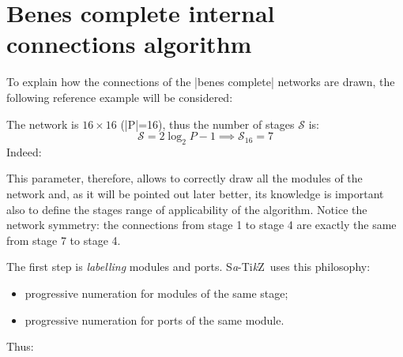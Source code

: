 \documentclass{ltxdoc}
\newcommand\Tikz{Ti\textit kZ}
\newcommand{\saTikZ}{S\textit{a}-\Tikz}
\begin{document}
\section{Benes complete internal connections algorithm}
\label{sec:benesconnalg}
To explain how the connections of the |benes complete| networks are drawn, the following reference example will be considered:
\begin{center}
\scalebox{0.75}{
	\begin{tikzpicture}[module size=0.75cm, module ysep=1, module xsep=2.5]
		\node[P=16, benes complete]{};
	\end{tikzpicture}
}
\end{center}
The network is $16\times 16$ (|P|=16), thus the number of stages $\mathcal{S}$ is:
\[\mathcal{S}=2\log_2{P}-1 \implies \mathcal{S}_{16}=7\]
Indeed:
\begin{center}
\end{center}
This parameter, therefore, allows to correctly draw all the modules of the network and, as it will be pointed out later better, its knowledge is important also to define the stages range of applicability of the algorithm. Notice the network symmetry: the connections from stage 1 to stage 4 are exactly the same from stage 7 to stage 4.  
\pagebreak

The first step is \emph{labelling} modules and ports. \saTikZ\ uses this philosophy:
\begin{itemize}
\item progressive numeration for modules of the same stage;
\item progressive numeration for ports of the same module.
\end{itemize}

Thus:
\begin{center}
\end{center}
\end{document}
